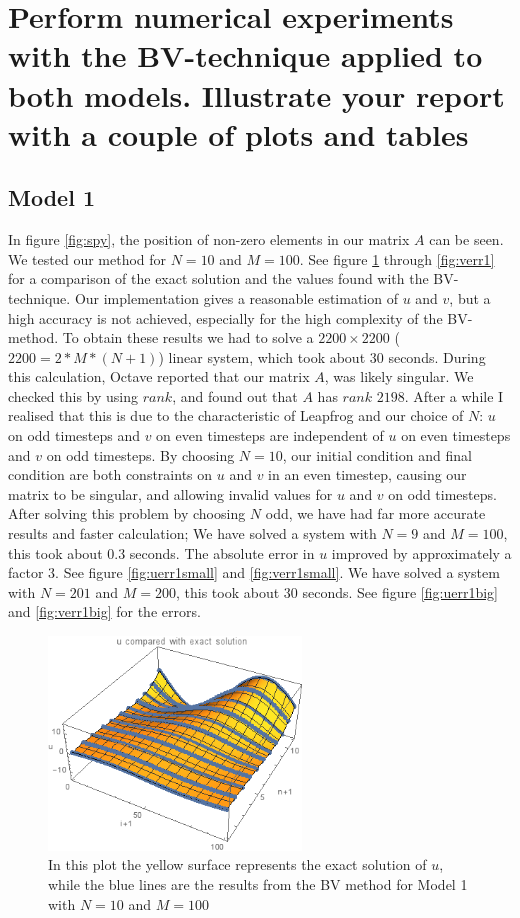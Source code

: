 \documentclass{article}
\renewcommand{\(}{\left(}
\renewcommand{\)}{\right)}
\begin{document}
\section*{Perform numerical experiments with the BV-technique applied to both models. Illustrate your report with a couple of plots and tables}
\subsection*{Model 1}
In figure \ref{fig:spy}, the position of non-zero elements in our matrix $A$ can be seen.
We tested our method for $N = 10$ and $M = 100$. See figure \ref{fig:ucomp1} through \ref{fig:verr1} for a comparison of the exact solution and the values found with the BV-technique. Our implementation gives a reasonable estimation of $u$ and $v$, but a high accuracy is not achieved, especially for the high complexity of the BV-method. To obtain these results we had to solve a $2200\times2200$ ($2200 = 2*M*(N+1)$) linear system, which took about 30 seconds. During this calculation, Octave reported that our matrix $A$, was likely singular. We checked this by using $rank$, and found out that $A$ has $rank$ $2198$. After a while I realised that this is due to the characteristic of Leapfrog and our choice of $N$: $u$ on odd timesteps and $v$ on even timesteps are independent of $u$ on even timesteps and $v$ on odd timesteps. By choosing $N = 10$, our initial condition and final condition are both constraints on $u$ and $v$ in an even timestep, causing our matrix to be singular, and allowing invalid values for $u$ and $v$ on odd timesteps. After solving this problem by choosing $N$ odd, we have had far more accurate results and faster calculation;%
We have solved a system with $N = 9$ and $M = 100$, this took about $0.3$ seconds. The absolute error in $u$ improved by approximately a factor 3. See figure \ref{fig:uerr1small} and \ref{fig:verr1small}.
We have solved a system with $N = 201$ and $M = 200$, this took about $30$ seconds. See figure \ref{fig:uerr1big} and \ref{fig:verr1big} for the errors.

\begin{figure}
\centering
\includegraphics[width=0.6\textwidth]{uCompared.png}
\caption{In this plot the yellow surface represents the exact solution of $u$, while the blue lines are the results from the BV method for Model 1 with $N=10$ and $M=100$}
\label{fig:ucomp1}
\end{figure}
\end{document}
